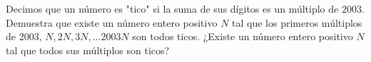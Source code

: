 Decimos que un número es "tico" si la suma de sus dígitos es un múltiplo de $2003$.
Demuestra que existe un número entero positivo $N$ tal que los primeros múltiplos de $2003$, $N,2N,3N,\ldots 2003N$ son todos ticos.
¿Existe un número entero positivo $N$ tal que todos sus múltiplos son ticos?

